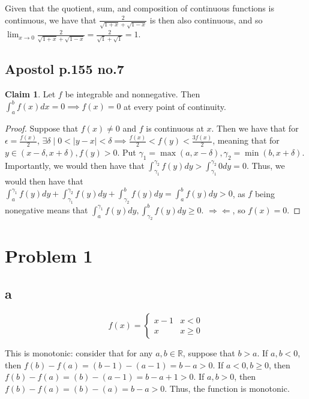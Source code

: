 \documentclass[12pt,letterpaper]{article}
\theoremstyle{definition}
\newtheorem*{claim}{Claim}
\newcommand{\contra}{\Rightarrow\!\Leftarrow}
\newcommand{\R}{\mathbb{R}}
\begin{document}
Given that the quotient, sum, and composition of continuous functions is
continuous, we have that $\frac{2}{\sqrt{1+x}+\sqrt{1-x}}$ is then also
continuous, and so $\lim_{x\rightarrow 0} \frac{2}{\sqrt{1+x}+\sqrt{1-x}} =
\frac{2}{\sqrt{1} + \sqrt{1}} = 1$.

\subsection*{Apostol p.155 no.7}

\begin{claim}
  Let $f$ be integrable and nonnegative. Then $\int_a^bf(x)dx = 0 \implies f(x)
  = 0$ at every point of continuity.
\end{claim}

\begin{proof}
  Suppose that $f(x) \neq 0$ and $f$ is continuous at $x$. Then we have that for
  $\epsilon = \frac{f(x)}{2}$, $\exists \delta \mid 0 < |y - x| < \delta
  \implies \frac{f(x)}{2} < f(y) < \frac{3f(x)}{2}$, meaning that for $y \in (x -
  \delta, x + \delta), f(y) > 0$. Put $\gamma_1 = \max(a, x-\delta), \gamma_2 =
  \min(b, x+\delta).$ Importantly, we would then have that $\int_{\gamma_1}^{\gamma_2}f(y)dy > \int_{\gamma_1}^{\gamma_2}0dy = 0$. Thus, we
  would then have that $\int_a^{\gamma_1} f(y)dy +
  \int_{\gamma_1}^{\gamma_2}f(y)dy + \int_{\gamma_2}^bf(y)dy = \int_a^bf(y)dy >
  0$, as $f$ being nonegative means that $\int_a^{\gamma_1}f(y)dy,
  \int_{\gamma_2}^bf(y)dy \geq 0$. $\contra$, so $f(x) = 0$.
\end{proof}

\section*{Problem 1}

\subsection*{a}

\[
  f(x) = \begin{cases}
    x - 1 & x < 0 \\
    x & x \geq 0
  \end{cases}
\]

This is monotonic: consider that for any $a,b \in \R$, suppose that $b > a$. If
$a,b < 0$, then $f(b) - f(a) = (b -1) - (a-1) = b-a > 0$. If $a < 0, b \geq 0$,
then $f(b) - f(a) = (b) - (a-1) = b-a + 1> 0$. If $a,b > 0$, then $f(b) - f(a)
= (b) - (a) = b-a > 0$. Thus, the function is monotonic.
\end{document}
